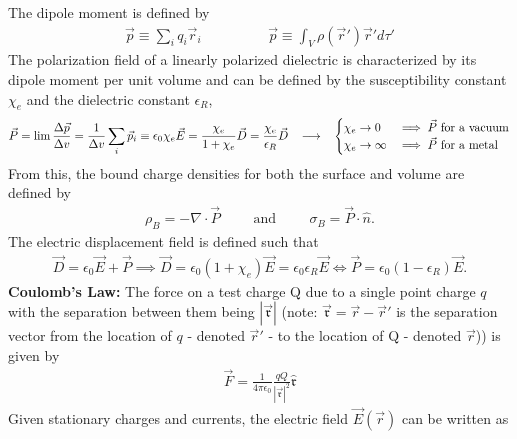 The dipole moment is defined by
\begin{align}
	\vec{p} \equiv \sum_{i}^{}q_i \vec{r}_i \hspace{2cm} \vec{p}\equiv \int_V \rho(\vec{r}')\vec{r}' d\tau'
\end{align}
The polarization field of a linearly polarized dielectric is characterized by its dipole moment per unit volume and can be defined by the susceptibility constant $\chi_e$ and the dielectric constant $\epsilon_R$,
\begin{align}
	\vec{P} =\lim \frac{\Delta \vec{p}}{\Delta v} = \frac{1}{\Delta v}\sum_{i}\vec{p}_i\equiv \epsilon_0 \chi_e \vec{E}  = \frac{\chi_e}{1+\chi_e}\vec{D} = \frac{\chi_e}{\epsilon_R}\vec{D}\hspace{0.3cm}\longrightarrow \hspace{0.3cm}\begin{cases}
		\chi_e \rightarrow 0 & \implies \vec{P} \textrm{ for a vacuum} \\ \chi_e \rightarrow \infty & \implies \vec{P} \textrm{ for a metal}
		\end{cases}
\end{align}
From this, the bound charge densities for both the surface and volume are defined by
\begin{align}
	\rho_B = -\nabla \cdot \vec{P} \hspace{1cm}\textrm{and}\hspace{1cm}	\sigma_B = \vec{P} \cdot \hat{n}.
\end{align} 
The electric displacement field is defined such that
\begin{align}
	\vec{D} = \epsilon_0\vec{E}+\vec{P} \implies \vec{D} = \epsilon_0(1+\chi_e)\vec{E}=\epsilon_0 \epsilon_R \vec{E}\Longleftrightarrow \vec{P} = \epsilon_0(1-\epsilon_R)\vec{E}.
\end{align}
\textbf{Coulomb's Law:} The force on a test charge Q due to a single point charge $q$ with the separation between them being $|\vec{\mathfrak{r}}|$ (note: $\vec{\mathfrak{r}}=\vec{r}-\vec{r}'$ is the separation vector from the location of $q$ - denoted $\vec{r}'$ - to the location of Q - denoted $\vec{r}$)) is given by
\begin{align}
	\vec{F} = \frac{1}{4\pi\epsilon_0}\frac{qQ}{|\vec{\mathfrak{r}}|^2}\hat{\mathfrak{r}}
\end{align}
Given stationary charges and currents, the electric field $\vec{E}(\vec{r})$ can be written as
